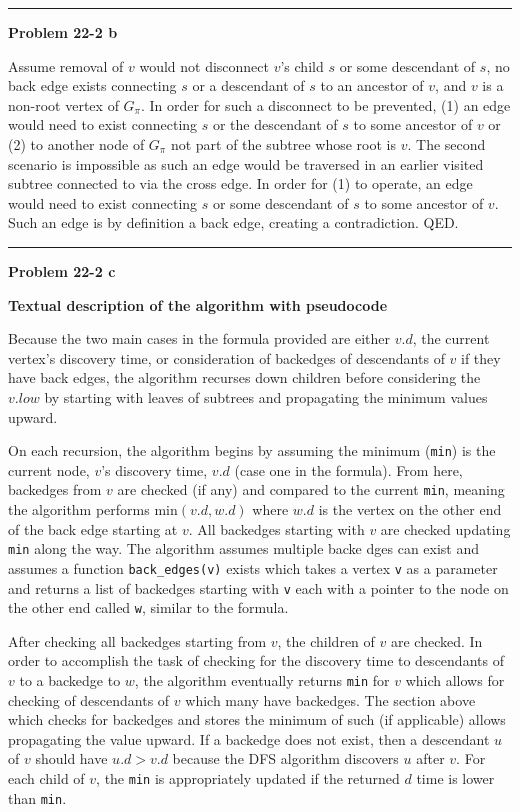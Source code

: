 \documentclass{article}
\newcommand\separator{\rule{\textwidth}{.2pt}}  %
\begin{document}
\separator

\textbf{Problem 22-2 b} 

Assume removal of $v$ would not disconnect $v$'s child $s$ or some descendant of
$s$, no back edge exists connecting $s$ or a descendant of $s$ to an ancestor of
$v$, and $v$ is a non-root vertex of $G_\pi$. In order for such a disconnect to 
be prevented, (1) an edge would need to exist connecting $s$ or the descendant 
of $s$ to some ancestor of $v$ or (2) to another node of $G_\pi$ not part of the
subtree whose root is $v$. The second scenario is impossible as such an edge 
would be traversed in an earlier visited subtree connected to via the cross 
edge. In order for (1) to operate, an edge would need to exist connecting $s$ or
some descendant of $s$ to some ancestor of $v$. Such an edge is by definition a
back edge, creating a contradiction. QED. 

\separator

\textbf{Problem 22-2 c} 

\textbf{Textual description of the algorithm with pseudocode}

Because the two main cases in the formula provided are either $v.d$, the current
vertex's discovery time, or consideration of backedges of descendants of $v$ if
they have back edges, the algorithm recurses down children before considering 
the $v.low$ by starting with leaves of subtrees and propagating the minimum 
values upward. 

On each recursion, the algorithm begins by assuming the minimum (\texttt{min}) 
is the current node, $v$'s discovery time, $v.d$ (case one in the formula). 
From here, backedges from $v$ are checked (if any) and compared to the current 
\texttt{min}, meaning the algorithm performs $\text{min}(v.d, w.d)$ where $w.d$
is the vertex on the other end of the back edge starting at $v$. All backedges
starting with $v$ are checked updating \texttt{min} along the way. The algorithm
assumes multiple backe dges can exist and assumes a function 
\texttt{back\_edges(v)} exists which takes a vertex \texttt{v} as a parameter 
and returns a list of backedges starting with \texttt{v} each with a pointer to
the node on the other end called \texttt{w}, similar to the formula. 

After checking all backedges starting from $v$, the children of $v$ are checked.
In order to accomplish the task of checking for the discovery time to 
descendants of $v$ to a backedge to $w$, the algorithm eventually returns
\texttt{min} for $v$ which allows for checking of descendants of $v$ which many
have backedges. The section above which checks for backedges and stores the
minimum of such (if applicable) allows propagating the value upward. If a
backedge does not exist, then a descendant $u$ of $v$ should have $u.d > v.d$ 
because the DFS algorithm discovers $u$ after $v$. For each child of $v$, the
\texttt{min} is appropriately updated if the returned $d$ time is lower than
\texttt{min}. 
\end{document}
